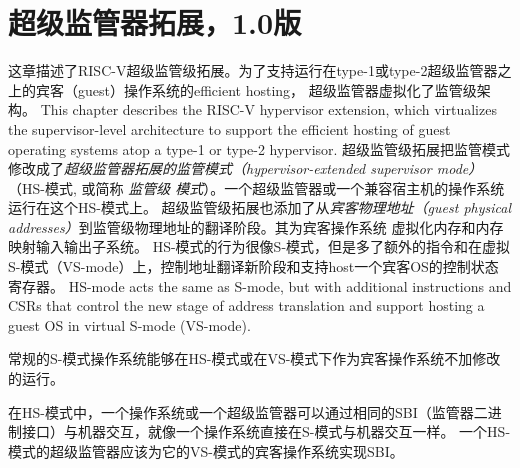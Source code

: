 \chapter{超级监管器拓展，1.0版}
\label{hypervisor}

这章描述了RISC-V超级监管级拓展。为了支持运行在type-1或type-2超级监管器之上的宾客（guest）操作系统的efficient hosting，
超级监管器虚拟化了监管级架构。
This chapter describes the RISC-V hypervisor extension, which virtualizes the
supervisor-level architecture to support the efficient hosting of guest
operating systems atop a type-1 or type-2 hypervisor.
超级监管级拓展把监管模式修改成了{\em 超级监管器拓展的监管模式（hypervisor-extended supervisor mode）}（HS-模式, 或简称 {\em 监管级
模式}）。一个超级监管器或一个兼容宿主机的操作系统运行在这个HS-模式上。
超级监管级拓展也添加了从{\em 宾客物理地址（guest physical addresses）}到监管级物理地址的翻译阶段。其为宾客操作系统
虚拟化内存和内存映射输入输出子系统。
HS-模式的行为很像S-模式，但是多了额外的指令和在虚拟S-模式（VS-mode）上，控制地址翻译新阶段和支持host一个宾客OS的控制状态寄存器。
HS-mode
acts the same as S-mode, but with additional instructions and CSRs that control
the new stage of address translation and support hosting a guest OS in virtual
S-mode (VS-mode).

常规的S-模式操作系统能够在HS-模式或在VS-模式下作为宾客操作系统不加修改的运行。

在HS-模式中，一个操作系统或一个超级监管器可以通过相同的SBI（监管器二进制接口）与机器交互，就像一个操作系统直接在S-模式与机器交互一样。
一个HS-模式的超级监管器应该为它的VS-模式的宾客操作系统实现SBI。

